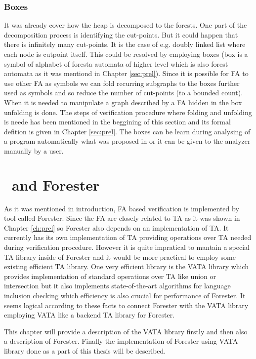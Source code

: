 \subsection{Boxes}
\label{subsec:boxes}

It was already cover how the heap is decomposed to the forests.
One part of the decomposition process is identifying the cut-points.
But it could happen that there is infinitely many cut-points.
It is the case of e.g. doubly linked list where each node is cutpoint itself.
This could be resolved by employing boxes (box is a symbol of alphabet of foresta automata of higher level which is also forest automata as it was mentiond in Chapter \ref{sec:prel}).
Since it is possible for FA to use other FA as symbols we can fold recurring subgraphs to the boxes further used as symbols
and so reduce the number of cut-points (to a bounded count).
When it is needed to manipulate a graph described by a FA hidden in the box unfolding is done.
The steps of verification procedure where folding and unfolding is neede has been mentioned in the beggining of this section
and its formal defition is given in Chapter \ref{sec:prel}.
The boxes can be learn during analysing of a program automatically what was proposed in \cite{cav13} or
it can be given to the analyzer manually by a user.

\chapter{\vata\ and Forester}
\label{ch:tools}

As it was mentioned in introduction, FA based verification is implemented by tool
called Forester.
Since the FA are closely related to TA as it was shown in Chapter \ref{ch:prel} so
Forester also depends on an implementation of TA.
It currently has its own implementation of TA providing operations over TA needed during verification procedure.
However it is quite impratical to mantain a special TA library inside of Forester
and it would be more practical to employ some existing efficient TA library.
One very efficient library is the VATA library which provides implementation of standard operations over TA like union or intersection
but it also implements state-of-the-art algorithms \cite{tacas11} for language inclusion checking which efficiency
is also crucial for performance of Forester.
It seems logical according to these facts to connect Forester with the VATA library employing VATA like a backend TA library for Forester.

This chapter will provide a description of the VATA library firstly and then also a description of Forester.
Finally the implementation of Forester using VATA library done as a part of this thesis will be described.

